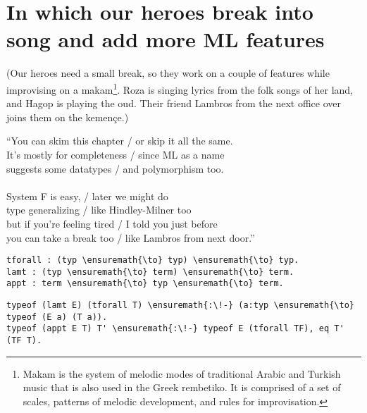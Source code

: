 \section{In which our heroes break into song and add more ML
features}\label{in-which-our-heroes-break-into-song-and-add-more-ml-features}

\begin{scenecomment}
(Our heroes need a small break, so they work on a couple of features while improvising on a makam\footnote{Makam is the system of melodic modes of traditional Arabic and Turkish music that is also used in the Greek rembetiko. It is comprised of a set of scales, patterns of melodic development, and rules for improvisation.}. Roza is singing lyrics from the folk songs of her land, and Hagop is playing the oud. Their friend Lambros from the next office over joins them on the kemen\c{c}e.)
\end{scenecomment}

\begin{versy}
``You can skim this chapter / or skip it all the same. \\
It's mostly for completeness / since ML as a name \\
suggests some datatypes / and polymorphism too. \\
\hspace{1em} \vspace{-0.5em} \\
System F is easy, / later we might do \\
type generalizing / like Hindley-Milner too \\
but if you're feeling tired / I told you just before \\
you can take a break too / like Lambros from next door.''
\end{versy}

\begin{verbatim}
tforall : (typ \ensuremath{\to} typ) \ensuremath{\to} typ.
lamt : (typ \ensuremath{\to} term) \ensuremath{\to} term.
appt : term \ensuremath{\to} typ \ensuremath{\to} term.
\end{verbatim}

\importantCodeblock{}

\begin{verbatim}
typeof (lamt E) (tforall T) \ensuremath{:\!-} (a:typ \ensuremath{\to} typeof (E a) (T a)).
typeof (appt E T) T' \ensuremath{:\!-} typeof E (tforall TF), eq T' (TF T).
\end{verbatim}

